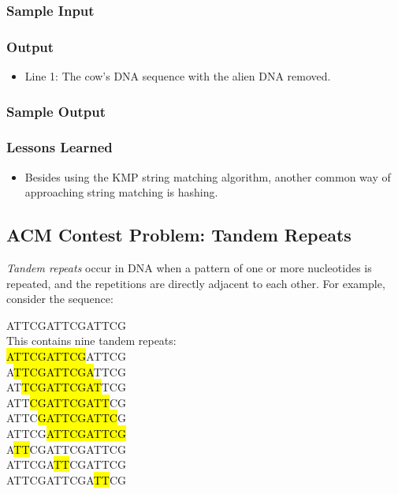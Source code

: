 \subsubsection{Sample Input}

\subsubsection{Output}
\begin{itemize}
\item Line 1: The cow's DNA sequence with the alien DNA removed.
\end{itemize}

\subsubsection{Sample Output}

\subsubsection{Lessons Learned}
\begin{itemize}
	\item Besides using the KMP string matching algorithm, another common way of approaching string matching is hashing.
\end{itemize}

\subsection{ACM Contest Problem: Tandem Repeats\cite{acmsoutheastregional2013}}
\textit{Tandem repeats} occur in DNA when a pattern of one or more nucleotides is repeated, and the repetitions are directly adjacent to each other.
For example, consider the sequence:
\begin{center}
	ATTCGATTCGATTCG\\
	This contains nine tandem repeats:\\
	\hl{ATTCGATTCG}ATTCG\\
	A\hl{TTCGATTCGA}TTCG\\
	AT\hl{TCGATTCGAT}TCG\\
	ATT\hl{CGATTCGATT}CG\\
	ATTC\hl{GATTCGATTC}G\\
	ATTCG\hl{ATTCGATTCG}\\
	A\hl{TT}CGATTCGATTCG\\
	ATTCGA\hl{TT}CGATTCG\\
	ATTCGATTCGA\hl{TT}CG\\
\end{center}

